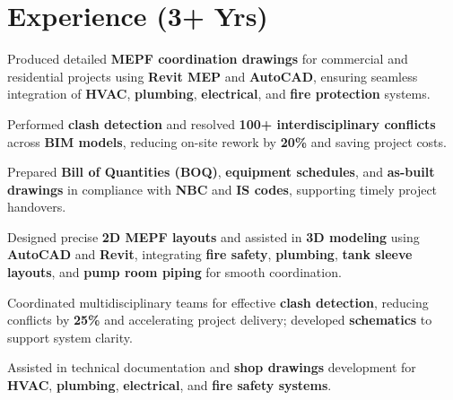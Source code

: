 \documentclass[]{deedy-resume-openfont}
\begin{document}
\begin{minipage}[t]{0.61\textwidth} 


\section{Experience (3+ Yrs)}
\vspace{\topsep} %
\begin{tightemize}
\item Produced detailed \textbf{MEPF coordination drawings} for commercial and residential projects using \textbf{Revit MEP} and \textbf{AutoCAD}, ensuring seamless integration of \textbf{HVAC}, \textbf{plumbing}, \textbf{electrical}, and \textbf{fire protection} systems.
\item Performed \textbf{clash detection} and resolved \textbf{100+ interdisciplinary conflicts} across \textbf{BIM models}, reducing on-site rework by \textbf{20\%} and saving project costs.
\item Prepared \textbf{Bill of Quantities (BOQ)}, \textbf{equipment schedules}, and \textbf{as-built drawings} in compliance with \textbf{NBC} and \textbf{IS codes}, supporting timely project handovers.
\end{tightemize}
\sectionsep

\begin{tightemize}
\item Designed precise \textbf{2D MEPF layouts} and assisted in \textbf{3D modeling} using \textbf{AutoCAD} and \textbf{Revit}, integrating \textbf{fire safety}, \textbf{plumbing}, \textbf{tank sleeve layouts}, and \textbf{pump room piping} for smooth coordination.
\item Coordinated multidisciplinary teams for effective \textbf{clash detection}, reducing conflicts by \textbf{25\%} and accelerating project delivery; developed \textbf{schematics} to support system clarity.
\item Assisted in technical documentation and \textbf{shop drawings} development for \textbf{HVAC}, \textbf{plumbing}, \textbf{electrical}, and \textbf{fire safety systems}.
\end{tightemize}
\sectionsep


\end{minipage}
\end{document}
